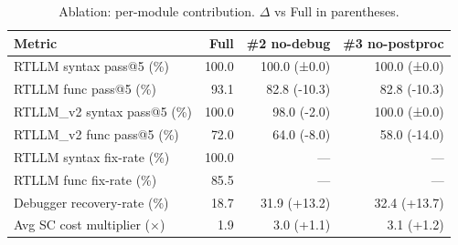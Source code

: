 \begin{table}[t]
\centering
\caption{Ablation: per-module contribution. $\Delta$ vs Full in parentheses.}
\label{tab:ablation}
\begin{tabular}{lrrr}
\toprule
Metric & Full & \#2 no-debug & \#3 no-postproc \\
\midrule
RTLLM syntax pass@5 (\%) & 100.0 & 100.0 {\footnotesize (±0.0)} & 100.0 {\footnotesize (±0.0)} \\
RTLLM func pass@5 (\%) & 93.1 & 82.8 {\footnotesize (-10.3)} & 82.8 {\footnotesize (-10.3)} \\
RTLLM\_v2 syntax pass@5 (\%) & 100.0 & 98.0 {\footnotesize (-2.0)} & 100.0 {\footnotesize (±0.0)} \\
RTLLM\_v2 func pass@5 (\%) & 72.0 & 64.0 {\footnotesize (-8.0)} & 58.0 {\footnotesize (-14.0)} \\
RTLLM syntax fix-rate (\%) & 100.0 & — & — \\
RTLLM func fix-rate (\%) & 85.5 & — & — \\
Debugger recovery-rate (\%) & 18.7 & 31.9 {\footnotesize (+13.2)} & 32.4 {\footnotesize (+13.7)} \\
Avg SC cost multiplier ($\times$) & 1.9 & 3.0 {\footnotesize (+1.1)} & 3.1 {\footnotesize (+1.2)} \\
\bottomrule
\end{tabular}
\end{table}
